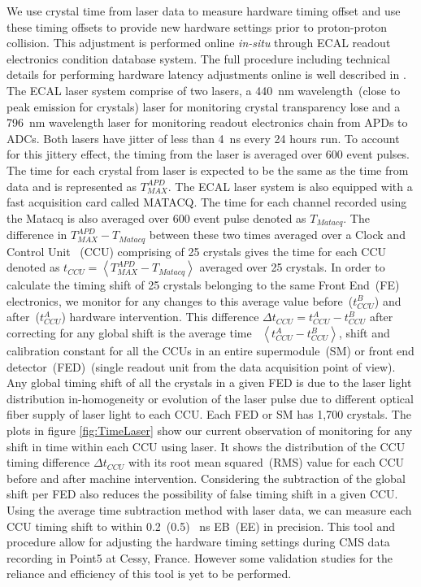 We use crystal time from laser data to measure hardware timing offset and use these timing offsets to provide new hardware settings prior to proton-proton collision. This adjustment is performed online \textit{in-situ} through ECAL readout electronics condition database system. The full procedure including technical details for performing hardware latency adjustments online is well described in \cite{ECALHW}. The ECAL laser system comprise of two lasers, a 440~nm wavelength~(close to peak emission for \pb crystals) laser for monitoring crystal transparency lose and a 796~nm wavelength laser for monitoring readout electronics chain from APDs to ADCs. Both lasers have jitter of less than 4~ns every 24 hours run. To account for this jittery effect, the timing from the laser is averaged over 600 event pulses. The time for each crystal from laser is expected to be the same as the time from data and is represented as $T^{APD}_{MAX} $. The ECAL laser system is also equipped with a fast acquisition card called MATACQ. The time for each channel recorded using the Matacq is also averaged over 600 event pulse denoted as $ T_{Matacq}$.
The difference in $ T^{APD}_{MAX} - T_{Matacq} $ between these two times averaged over a Clock and Control Unit ~(CCU) comprising of 25 crystals gives the time for each CCU denoted as $ t_{CCU} = \left\langle T^{APD}_{MAX} - T_{Matacq} \right\rangle $ averaged over 25 crystals.
In order to calculate the timing shift of 25 crystals belonging to the same Front End~(FE) electronics, we monitor for any changes to this average value before~($t^{B}_{CCU} $) and after~($t^{A}_{CCU} $) hardware intervention.  This difference $\Delta t_{CCU} = t^{A}_{CCU} - t^{B}_{CCU} $ after correcting for any global shift is the average time \ie ~$\left\langle t^{A}_{CCU} - t^{B}_{CCU} \right\rangle $, shift and calibration constant for all the CCUs in an entire supermodule~(SM) or front end detector~(FED)~(single readout unit from the data acquisition point of view). Any global timing shift of all the crystals in a given FED is due to the laser light distribution in-homogeneity or evolution of the laser pulse due to different optical fiber supply of laser light to each CCU. Each FED or SM has 1,700 \pb crystals. 
The plots in figure \ref{fig:TimeLaser} show our current observation of  monitoring for any shift in time within each CCU using laser. It shows the distribution of the CCU timing difference $ \Delta t_{CCU}$ with its root mean squared~(RMS) value for each CCU before and after machine intervention. Considering the subtraction of the global shift per FED also reduces the possibility of false timing shift in a given CCU.
Using the average time subtraction method with laser data, we can measure each CCU timing shift to within 0.2~(0.5)~ ns EB~(EE) in precision. This tool and procedure allow for adjusting the hardware timing settings during CMS data  recording in Point5 at Cessy, France. However some validation studies for the reliance and efficiency of this tool is yet to be performed.  


